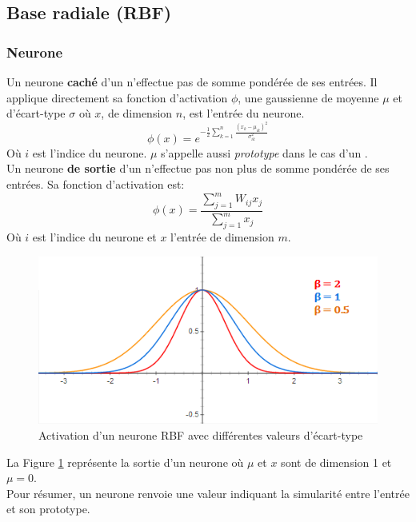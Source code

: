 \subsection{Base radiale (RBF)}
\newcommand{\factnorm}{\sum_{r=1}^{m}x_{r}}
\subsubsection{Neurone}
Un neurone \textbf{caché} d'un \rbf n'effectue pas de somme pondérée de ses entrées.
Il applique directement sa fonction d'activation $\phi$, une gaussienne de moyenne $\mu$ et d'écart-type $\sigma$ où $x$, de dimension $n$, est l'entrée du neurone.
\begin{equation}\label{eq:cachephi}
 \phi(x) = e^{-\frac{1}{2}\sum_{k=1}^{n}\frac{(x_k-\mu_{ik})^2}{\sigma_{ik}^{2}}}
\end{equation}
Où $i$ est l'indice du neurone. $\mu$ s'appelle aussi \emph{prototype} dans le cas d'un \rbf.
\\

Un neurone \textbf{de sortie} d'un \rbf n'effectue pas non plus de somme pondérée de ses entrées. Sa fonction d'activation est:
\begin{equation}\label{eq:sortiephi}
 \phi(x) = \frac{\sum_{j=1}^{m}W_{ij}x_{j}}{\sum_{j=1}^{m}x_{j}}
\end{equation}
Où $i$ est l'indice du neurone et $x$ l'entrée de dimension $m$.
\begin{figure}
 \centering
 \includegraphics[scale=0.7]{../figures/RBFactivation.png}
 \caption{Activation d'un neurone RBF avec différentes valeurs d'écart-type}
 \label{rbfactivation}
\end{figure}
La Figure \ref{rbfactivation} représente la sortie d'un neurone \rbf où $\mu$ et $x$ sont de dimension 1 et $\mu = 0$.\\
Pour résumer, un neurone \rbf renvoie une valeur indiquant la simularité entre l'entrée et son prototype.
